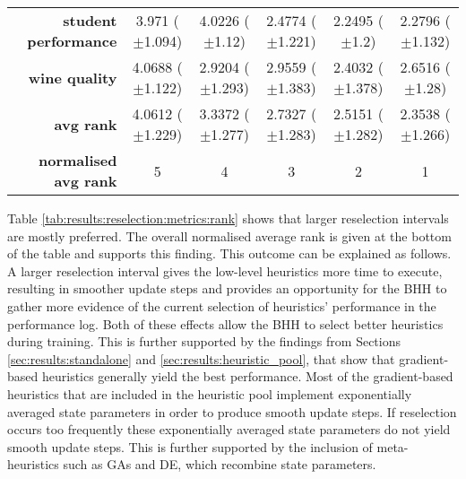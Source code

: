\begin{table}[htb]
{\begin{tabular}{r|ccccc}
			\textbf{student performance} & \cellcolor[rgb]{ .976,  .431,  .424}3.971 ($\pm$1.094)  & \cellcolor[rgb]{ .973,  .412,  .42}4.0226 ($\pm$1.12)   & \cellcolor[rgb]{ 1,  .922,  .518}2.4774 ($\pm$1.221)    & \cellcolor[rgb]{ .388,  .745,  .482}2.2495 ($\pm$1.2)   & \cellcolor[rgb]{ .467,  .765,  .486}2.2796 ($\pm$1.132) \\
			\textbf{wine quality}        & \cellcolor[rgb]{ .973,  .412,  .42}4.0688 ($\pm$1.122)  & \cellcolor[rgb]{ 1,  .922,  .518}2.9204 ($\pm$1.293)    & \cellcolor[rgb]{ 1,  .906,  .518}2.9559 ($\pm$1.383)    & \cellcolor[rgb]{ .388,  .745,  .482}2.4032 ($\pm$1.378) & \cellcolor[rgb]{ .678,  .827,  .498}2.6516 ($\pm$1.28)  \\
			\midrule
			\textbf{avg rank}            & \cellcolor[rgb]{ .973,  .412,  .42}4.0612 ($\pm$1.229)  & \cellcolor[rgb]{ .988,  .69,  .475}3.3372 ($\pm$1.277)  & \cellcolor[rgb]{ 1,  .922,  .518}2.7327 ($\pm$1.283)    & \cellcolor[rgb]{ .647,  .82,  .494}2.5151 ($\pm$1.282)  & \cellcolor[rgb]{ .388,  .745,  .482}2.3538 ($\pm$1.266) \\
			\midrule
			\textbf{normalised avg rank} & \cellcolor[rgb]{ .973,  .412,  .42}5                    & \cellcolor[rgb]{ .988,  .667,  .471}4                   & \cellcolor[rgb]{ 1,  .922,  .518}3                      & \cellcolor[rgb]{ .694,  .831,  .498}2                   & \cellcolor[rgb]{ .388,  .745,  .482}1                   \\
		\end{tabular}%

	}
\end{table}%

Table \ref{tab:results:reselection:metrics:rank} shows that larger reselection intervals are mostly preferred. The overall normalised average rank is given at the bottom of the table and supports this finding. This outcome can be explained as follows. A larger reselection interval gives the low-level heuristics more time to execute, resulting in smoother update steps and provides an opportunity for the \acs{BHH} to gather more evidence of the current selection of heuristics' performance in the performance log. Both of these effects allow the \acs{BHH} to select better heuristics during training. This is further supported by the findings from Sections \ref{sec:results:standalone} and \ref{sec:results:heuristic_pool}, that show that gradient-based heuristics generally yield the best performance. Most of the gradient-based heuristics that are included in the heuristic pool implement exponentially averaged state parameters in order to produce smooth update steps. If reselection occurs too frequently these exponentially averaged state parameters do not yield smooth update steps. This is further supported by the inclusion of meta-heuristics such as \acp{GA} and \acs{DE}, which recombine state parameters.

